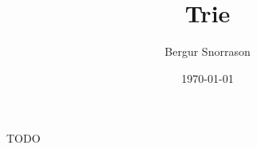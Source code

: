 \title{Trie}
\author{Bergur Snorrason}
\date{\today}



\frame{\titlepage}

{
	{
		\item<1-> TODO
	}
}

{
}


